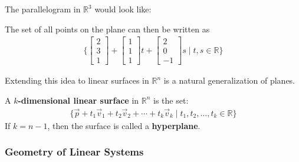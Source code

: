 The parallelogram in $\mathbb{R}^3$ would look like:
%

\begin{center}
\end{center}


The set of all points on the plane can then be written as
%
\begin{align*}
\{ \begin{bmatrix}
2 \\ 3 \\ 1
\end{bmatrix} + \begin{bmatrix}
1 \\ 1 \\ 1
\end{bmatrix} t +
\begin{bmatrix}
2 \\ 0 \\ -1
\end{bmatrix} s \; | \; t,s \in \mathbb{R} \}
\end{align*}

Extending this idea to linear surfaces in $\mathbb{R}^n$ is a natural generalization of planes.
\begin{definition}
A \textbf{$k$-dimensional linear surface} in $\mathbb{R}^n$ is the set:
\begin{align*}
\{ \vec{p} + t_1 \vec{v}_1 + t_2 \vec{v}_2 + \cdots + t_k \vec{v}_k \; | \; t_1, t_2, \ldots, t_k \in \mathbb{R} \}
\end{align*}
If $k=n-1$, then the surface is called a \textbf{hyperplane}.
\end{definition}



\subsubsection{Geometry of Linear Systems}

